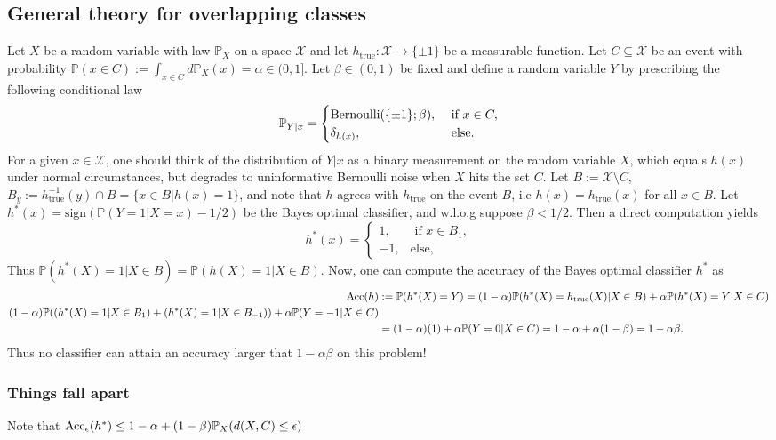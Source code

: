 \subsection{General theory for overlapping classes}
Let $X$ be a random variable with law $\mathbb{P}_X$ on a space $\mathcal X$ and let
$h_{\text{true}}:\mathcal X \rightarrow \{\pm 1\}$ be a measurable function. Let $C \subseteq
\mathcal X$ be an event with probability $\mathbb{P}(x \in C):=\int_{x \in C}d\mathbb{P}_X(x)
=\alpha \in (0, 1]$. Let $\beta \in (0, 1)$ be fixed and define a random variable $Y$
by prescribing the following conditional law $$\mathbb{P}_{Y|x}
= \begin{cases}\operatorname{Bernoulli}(\{\pm 1\};\beta),&\mbox{ if }x \in
  C,\\\delta_{h(x)},&\mbox{ else.}\end{cases}
$$
For a given $x \in \mathcal X$, one should think of the distribution of $Y|x$ as
a binary measurement on the random variable $X$, which equals $h(x)$ under
normal circumstances, but degrades to uninformative Bernoulli noise when $X$
hits the set $C$. Let $B:=\mathcal X\setminus C$, $B_y:=h_{\text{true}}^{-1}(y)\cap
B = \{x \in B | h(x)=1\}$, and note that $h$ agrees with
$h_{\text{true}}$ on the event $B$, i.e $h(x)=h_{\text{true}}(x)$ for all $x \in
B$. Let $h^*(x) = \text{sign}(\mathbb{P}(Y=1|X=x)- 1/2)$ be the Bayes optimal
classifier, and w.l.o.g suppose $\beta < 1/2$. Then a direct computation yields
$$
h^*(x) = \begin{cases}1,&\mbox{ if }x \in B_1,\\-1,&\mbox{
    else,}\end{cases}
$$
Thus $\mathbb{P}(h^*(X)=1|X \in B)=\mathbb{P}(h(X)=1|X \in B)$. Now, one can compute the
accuracy of the Bayes optimal classifier $h^*$ as
\begin{eqnarray*}
  \begin{split}
    \operatorname{Acc}(h)&:=\mathbb{P}(h^*(X)=Y)=(1-\alpha)
    \mathbb{P}(h^*(X)=h_{\text{true}}(X)|X \in B) + \alpha \mathbb{P}(h^*(X)=Y|X
    \in C)\\
   (1-\alpha)\mathbb{P}((h^*(X)=1|X \in B_1)+(h^*(X)=1|X \in B_{-1})) + \alpha \mathbb{P}(Y=-1|X
    \in C)\\    
    &=(1-\alpha)(1) + \alpha \mathbb{P}(Y=0|X\in C)=1-\alpha + \alpha(1-\beta) = 1 -
    \alpha\beta.
  \end{split}
\end{eqnarray*}
Thus no classifier can attain an accuracy larger that $1-\alpha\beta$ on this problem!

\subsubsection{Things fall apart}
Note that $\operatorname{Acc}_\epsilon(h^*) \le 1-\alpha+(1-\beta)\mathbb P_X(d(X,C) \le
\epsilon)$
